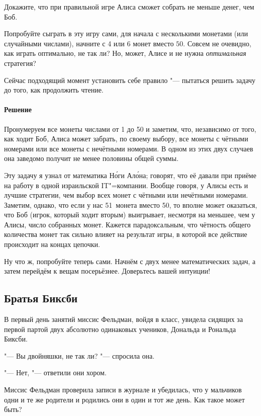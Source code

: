 \documentclass[twoside]{book}
\makeatletter
\newcommand{\rindex}[2][\imki@jobname]{%
\index[#1]{\detokenize{#2}}%
}
\makeatother
\begin{document}
Докажите, что при правильной игре Алиса сможет собрать не меньше денег, чем Боб.

\medskip

Попробуйте сыграть в эту игру сами, для начала с несколькими монетами (или случайными числами), начните с 4 или 6 монет вместо $50$.
Совсем не очевидно, как играть оптимально, не так ли?
Но, может, Алисе и не нужна \emph{оптимальная} стратегия? 

Сейчас подходящий момент установить себе правило "--- пытаться решить задачу до того, как продолжить чтение.

\paragraph{Решение}
Пронумеруем все монеты числами от 1 до 50 и заметим, что, независимо от того, как ходит Боб, Алиса может забрать, по своему выбору, все
монеты с чётными номерами или все монеты с нечётными номерами.
В одном из этих двух случаев она заведомо получит не менее половины общей суммы.
\heart

\medskip
Эту задачу я узнал от математика Н\'{о}ги Ал\'{о}на; говорят, что её давали при приёме на работу в одной израильской IT"=компании.
Вообще говоря, у Алисы есть и лучшие стратегии, чем выбор всех
монет с чётными или нечётными номерами.
Заметим, однако, что если у нас 51~монета вместо 50, то вполне может оказаться, что Боб (игрок,
который ходит вторым) выигрывает, несмотря на меньшее, чем у Алисы, число собранных монет.
Кажется парадоксальным, что чётность общего количества монет так сильно влияет на результат игры, в которой все
действие происходит на концах цепочки.

\medskip

Ну что ж, попробуйте теперь сами.
Начнём с двух менее математических задач, а затем перейдём к вещам посерьёзнее.
Доверьтесь вашей интуиции!

\subsection*{Братья Биксби} %
\rindex{Братья Биксби}

В первый день занятий миссис Фельдман, войдя в класс, увидела сидящих за первой партой двух абсолютно одинаковых учеников, Дональда и Рональда Биксби.

"--- Вы двойняшки, не так ли? "--- спросила она.

"--- Нет, "--- ответили они хором.

Миссис Фельдман проверила записи в журнале и убедилась, что у мальчиков одни и те же родители и родились они в один и тот же день.
Как такое может быть?
\end{document}
